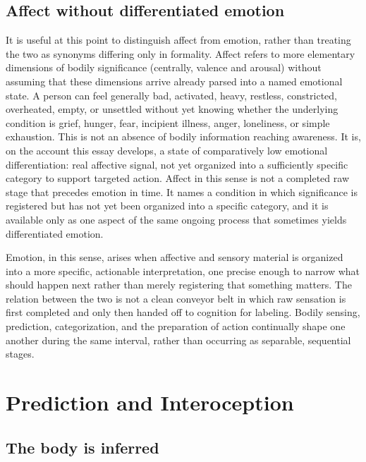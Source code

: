 \documentclass[11pt]{article}
\begin{document}
\subsection{Affect without differentiated emotion}

It is useful at this point to distinguish affect from emotion, rather than treating the two as synonyms differing only in formality. Affect refers to more elementary dimensions of bodily significance (centrally, valence and arousal) without assuming that these dimensions arrive already parsed into a named emotional state. A person can feel generally bad, activated, heavy, restless, constricted, overheated, empty, or unsettled without yet knowing whether the underlying condition is grief, hunger, fear, incipient illness, anger, loneliness, or simple exhaustion. This is not an absence of bodily information reaching awareness. It is, on the account this essay develops, a state of comparatively low emotional differentiation: real affective signal, not yet organized into a sufficiently specific category to support targeted action. Affect in this sense is not a completed raw stage that precedes emotion in time. It names a condition in which significance is registered but has not yet been organized into a specific category, and it is available only as one aspect of the same ongoing process that sometimes yields differentiated emotion.

Emotion, in this sense, arises when affective and sensory material is organized into a more specific, actionable interpretation, one precise enough to narrow what should happen next rather than merely registering that something matters. The relation between the two is not a clean conveyor belt in which raw sensation is first completed and only then handed off to cognition for labeling. Bodily sensing, prediction, categorization, and the preparation of action continually shape one another during the same interval, rather than occurring as separable, sequential stages.

\section{Prediction and Interoception}\label{sec:prediction}

\subsection{The body is inferred}
\end{document}
